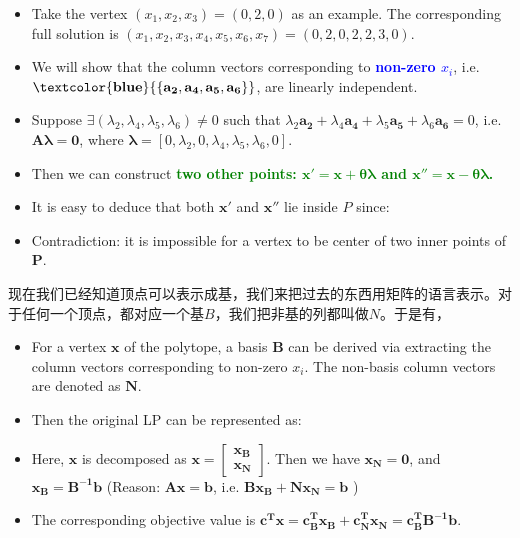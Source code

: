  \begin{itemize}
 \item Take the vertex $(x_1, x_2, x_3) = (0,2,0)$ as an example. The corresponding full solution is $(x_1,x_2,x_3,x_4,x_5,x_6,x_7)= ( 0, 2, 0, 2, 2, 3, 0)$.
  \item We will show that the column vectors corresponding to \textcolor{blue}{\bf non-zero $x_i$}, i.e. $\mathbf{ \textcolor{blue}{ \{a_2, a_4, a_5, a_6 \}}}$, are linearly independent.
  \item Suppose $\exists (\lambda_2, \lambda_4, \lambda_5,\lambda_6) \neq 0$ such that $\lambda_{2}\mathbf{a_{2}} + \lambda_{4}\mathbf{a_{4}} + \lambda_{5}\mathbf{a_{5}}+ \lambda_{6}\mathbf{a_{6}}  = 0$, i.e. $\mathbf{A\lambda=0}$, where $\mathbf{\lambda} = [0, \lambda_2, 0, \lambda_4, \lambda_5,\lambda_6, 0]$.
\item Then we can construct \textcolor{green}{\bf two other points: $\mathbf{x'=x+\theta \lambda}$ and $\mathbf{x''=x-\theta \lambda}$. }
\item It is easy to deduce  that both $\mathbf{x'}$ and $\mathbf{x''}$ lie inside $P$ since:
\begin{itemize}
\end{itemize}
 \item Contradiction: it is impossible for a vertex to be  center of two inner points of $\mathbf{P}$.
 \end{itemize}

 现在我们已经知道顶点可以表示成基，我们来把过去的东西用矩阵的语言表示。对于任何一个顶点，都对应一个基$B$，我们把非基的列都叫做$N$。于是有，
\begin{itemize}
\item For a vertex $\mathbf{x}$ of the polytope, a basis $\mathbf{B}$ can be derived via extracting the column vectors corresponding to non-zero $x_i$. The non-basis column vectors are denoted as $\mathbf{N}$.
\item Then  the original LP  can be represented as:


 \item Here, $\mathbf{x}$  is decomposed as $\mathbf{x=\left[\begin{array}{c}\mathbf{x_B}\\\mathbf{x_N}\end{array}\right]}$. Then  we have $\mathbf{x_N=0}$, and $\mathbf{x_B=B^{-1}b}$ (Reason: $\mathbf{Ax=b}$, i.e. $\mathbf{B x_B + N x_N = b}$ )
 \item The corresponding objective value is $\mathbf{c^T x = c_B^T x_B + c_N^T x_N = c_B^T B^{-1} b }$.
 \end{itemize}


